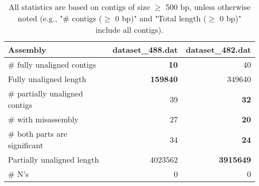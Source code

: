 \documentclass[12pt,a4paper]{article}
\begin{document}
\begin{table}[ht]
\begin{center}
\caption{All statistics are based on contigs of size $\geq$ 500 bp, unless otherwise noted (e.g., "\# contigs ($\geq$ 0 bp)" and "Total length ($\geq$ 0 bp)" include all contigs).}
\begin{tabular}{|l*{2}{|r}|}
\hline
Assembly & dataset\_488.dat & dataset\_482.dat \\ \hline
\# fully unaligned contigs & {\bf 10} & 40 \\ \hline
Fully unaligned length & {\bf 159840} & 349640 \\ \hline
\# partially unaligned contigs & 39 & {\bf 32} \\ \hline
\hspace{5mm}\# with misassembly & 27 & {\bf 20} \\ \hline
\hspace{5mm}\# both parts are significant & 34 & {\bf 24} \\ \hline
Partially unaligned length & 4023562 & {\bf 3915649} \\ \hline
\# N's & 0 & 0 \\ \hline
\end{tabular}
\end{center}
\end{table}
\end{document}
